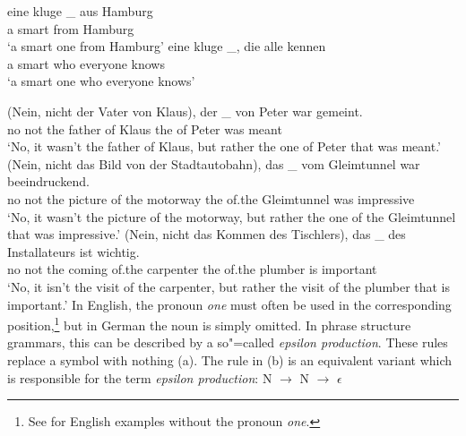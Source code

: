 \ex 
\gll eine kluge \_ aus Hamburg\\
	 a smart {} from Hamburg\\
\glt `a smart one from Hamburg'
\ex 
\gll eine kluge \_, die alle kennen\\
	 a smart {} who everyone knows\\
\glt `a smart one who everyone knows'
\zl

\eal
\label{ex-nounless-np-relational-noun}
\ex 
\gll (Nein, nicht der Vater von Klaus), der \_ von Peter war gemeint.\\
	\spacebr{}no not the father of Klaus the {} of Peter was meant\\
\glt `No, it wasn't the father of Klaus, but rather the one of Peter that was meant.'
\ex 
\gll (Nein, nicht das Bild von der Stadtautobahn), das \_ vom Gleimtunnel war beeindruckend.\\
	 \spacebr{}no not the picture of the motorway the {} of.the Gleimtunnel was impressive\\
\glt `No, it wasn't the picture of the motorway, but rather the one of the Gleimtunnel that was impressive.'
\ex 
\gll (Nein, nicht das Kommen des Tischlers), das \_ des Installateurs ist wichtig.\\
	 \spacebr{}no not the coming of.the carpenter the {} of.the plumber is important\\
\glt `No, it isn't the visit of the carpenter, but rather the visit of the plumber that is important.'
\zl
In English, the pronoun
\emph{one} must often be used in the corresponding position,\footnote{%
  See \citet[Section~4.12]{FLGR2012a} for English examples without the
  pronoun \emph{one}.
} but in German the noun is
simply omitted.
In phrase structure grammars, this can be described by a so"=called \emph{epsilon production}.
These rules replace a symbol with nothing (a). The rule in (b) is an equivalent variant which is responsible for the term \emph{epsilon production}:
\eal
\label{np-epsilon}
\ex N $\to$
\ex N $\to$ $\epsilon$
\zl 

